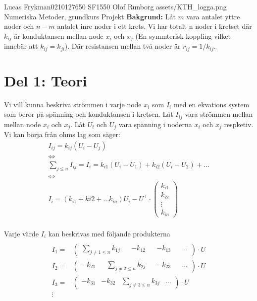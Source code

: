 \documentclass{assignment}
\begin{document}
\assignmentTitle
{Lucas Frykman}{0210127650}
{SF1550}
{Olof Runborg}
{assets/KTH_logga.png}
{Numeriska Metoder, grundkurs}
{Projekt}
\textbf{Bakgrund:} Låt $m$ vara antalet yttre noder och $n-m$ antalet inre noder i ett krets. Vi har totalt n noder i kretset
där $k_{ij}$ är konduktansen mellan node $x_i$ och $x_j$ (En symmterisk koppling vilket innebär att $k_{ij}=k_{ji}$). Där resistansen mellan två noder är $r_{ij}=1/k_{ij}$.
\section*{Del 1: Teori}
Vi vill kunna beskriva strömmen i varje node $x_{i}$ som $I_{i}$ med en ekvations system som beror på spänning och konduktansen i kretsen.
Låt $I_{ij}$ vara strömmen mellan mellan node $x_i$ och $x_j$. Låt $U_{i}$ och $U_{j}$ vara spänning i noderna $x_{i}$ och $x_j$ respketiv.
Vi kan börja från ohms lag som säger:
\begin{align}
    I_{ij} = k_{ij}(U_i-U_j) \label{An2}
    \\ \nonumber \Longleftrightarrow 
    \\ \nonumber \sum_{j\leq n}I_{ij} = I_i = k_{i1}(U_i-U_1) + 
    k_{i2}(U_i-U_2) + \dots \label{An3}
    \\ \nonumber \Longleftrightarrow
    \\ I_i = (k_{i1}+k{i2}+\dots k_{in})U_i - U^\top \cdot 
    \begin{pmatrix}
        k_{i1}
        \\ k_{i2}
        \\ \vdots
        \\ k_{in}
    \end{pmatrix}
\end{align}
\\ Varje värde $I_i$ kan beskrivas med följande produkterna
\begin{align*}
    \\ I_1 = &
    \begin{pmatrix}
        \sum_{j\neq 1 \leq n} k_{1j} && -k_{12} &&  -k_{13} && \dots 
    \end{pmatrix} \cdot U 
    \\ I_2 = &
    \begin{pmatrix}
        -k_{21} && \sum_{j\neq 2 \leq n} k_{2j} &&  -k_{23} && \dots
    \end{pmatrix} \cdot U 
    \nonumber
    \\ I_3 = &
    \begin{pmatrix}
        -k_{31} & -k_{32} & \sum_{j\neq 3 \leq n} k_{3j} & \dots
    \end{pmatrix} \cdot U 
    \\ \vdots
\end{align*}
\end{document}
